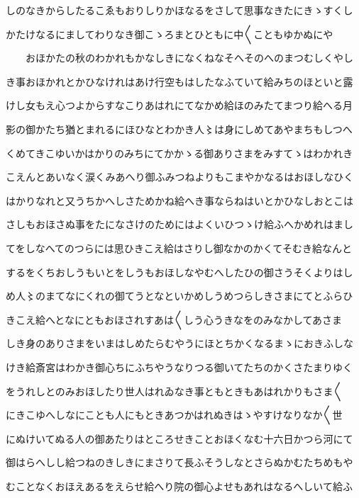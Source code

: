\documentclass[a4paper,11pt,landscape]{ltjtarticle}
\begin{document}
\par\medskip
しのなきからしたるこゑもおりしりかほなるをさして思事なきたにきゝすくし
\par\medskip
かたけなるにましてわりなき御こゝろまとひともに中〱こともゆかぬにや
\par\medskip
　　おほかたの秋のわかれもかなしきになくねなそへそのへのまつむしくやし
\par\medskip
き事おほかれとかひなけれはあけ行空もはしたなふていて給みちのほといと露
\par\medskip
けし女もえ心つよからすなこりあはれにてなかめ給ほのみたてまつり給へる月
\par\medskip
影の御かたち猶とまれるにほひなとわかき人〻は身にしめてあやまちもしつへ
\par\medskip
くめてきこゆいかはかりのみちにてかかゝる御ありさまをみすてゝはわかれき
\par\medskip
こえんとあいなく涙くみあへり御ふみつねよりもこまやかなるはおほしなひく
\par\medskip
はかりなれと又うちかへしさためかね給へき事ならねはいとかひなしおとこは
\par\medskip
さしもおほさぬ事をたになさけのためにはよくいひつゝけ給ふへかめれはまし
\par\medskip
てをしなへてのつらには思ひきこえ給はさりし御なかのかくてそむき給なんと
\par\medskip
するをくちおしうもいとをしうもおほしなやむへしたひの御さうそくよりはし
\par\medskip
め人〻のまてなにくれの御てうとなといかめしうめつらしきさまにてとふらひ
\par\medskip
きこえ給へとなにともおほされすあは〱しう心うきなをのみなかしてあさま
\par\medskip
しき身のありさまをいまはしめたらむやうにほとちかくなるまゝにおきふしな
\par\medskip
けき給斎宮はわかき御心ちにふちやうなりつる御いてたちのかくさたまりゆく
\par\medskip
をうれしとのみおほしたり世人はれゐなき事ともときもあはれかりもさま〱
\par\medskip
にきこゆへしなにことも人にもときあつかはれぬきはゝやすけなりなか〱世
\par\medskip
にぬけいてぬる人の御あたりはところせきことおほくなむ十六日かつら河にて
\par\medskip
御はらへしし給つねのきしきにまさりて長ふそうしなとさらぬかむたちめもや
\par\medskip
むことなくおほえあるをえらせ給へり院の御心よせもあれはなるへしいて給ふ
\par\medskip
\end{document}
